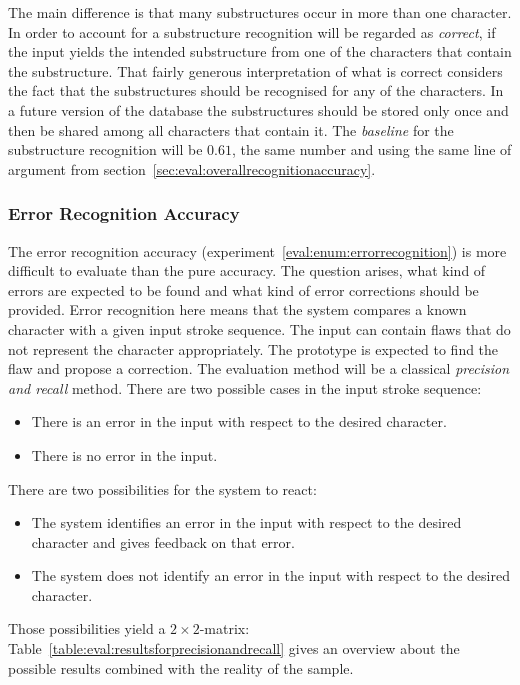 The main difference is that many substructures occur in more than one 
character. In order to account for a substructure recognition will be regarded 
as \emph{correct}, if the input yields the intended substructure from
one of the characters that contain the substructure.
That fairly generous interpretation of what is correct considers the fact
that the substructures should be recognised for any of the characters.
In a future version of the database the substructures should be stored only once
and then be shared among all characters that contain it.
The \emph{baseline} for the substructure recognition will be \(0.61\), 
the same number and using the same line of argument from 
section~\ref{sec:eval:overallrecognitionaccuracy}.

\subsubsection{Error Recognition Accuracy}
\label{sec:eval:errorrecognitionaccuracy}

The error recognition accuracy (experiment~\ref{eval:enum:errorrecognition}) 
is more difficult to evaluate than the pure accuracy.
The question arises, what kind of errors are expected to be found
and what kind of error corrections should be provided.
Error recognition here means that the system compares a known character with 
a given input stroke sequence. The input can contain flaws that do not 
represent the character appropriately. The prototype is expected to find the flaw
and propose a correction.
The evaluation method will be a classical \emph{precision and recall} method.
There are two possible cases in the input stroke sequence:
\begin{itemize}
  \item There is an error in the input with respect to the desired character.
  \item There is no error in the input.
\end{itemize}
There are two possibilities for the system to react:
\begin{itemize}
  \item The system identifies an error in the input with respect to the desired
        character and gives feedback on that error.
  \item The system does not identify an error in the input with respect to the
        desired character.
\end{itemize}
Those possibilities yield a \(2 \times 2\)-matrix:
Table~\ref{table:eval:resultsforprecisionandrecall} gives an overview about 
the possible results combined with the reality of the sample.

